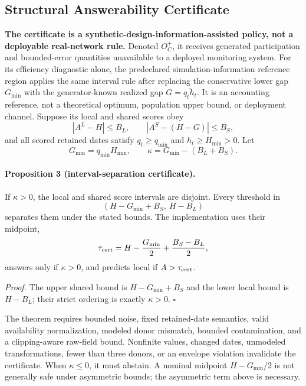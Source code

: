\subsection{Structural Answerability Certificate}

\textbf{The certificate is a synthetic-design-information-assisted policy, not
a deployable real-network rule.} Denoted $O_C^+$, it receives generated
participation and bounded-error quantities unavailable to a deployed monitoring
system. For its efficiency diagnostic alone, the predeclared
simulation-information reference region applies the same interval rule after
replacing the conservative lower gap $G_{\min}$ with the generator-known
realized gap $G=\overline{q_th_t}$. It is an accounting reference, not a
theoretical optimum, population upper bound, or deployment channel. Suppose
its local and shared scores obey
\[
  |A^L-H|\leq B_L,\qquad
  |A^S-(H-G)|\leq B_S,
\]
and all scored retained dates satisfy $q_t\geq q_{\min}$ and
$h_t\geq H_{\min}>0$. Let
\[
  G_{\min}=q_{\min}H_{\min},\qquad
  \kappa=G_{\min}-(B_L+B_S).
\]

\paragraph{Proposition 3 (interval-separation certificate).}
If $\kappa>0$, the local and shared score intervals are disjoint. Every
threshold in
\[
  \left(H-G_{\min}+B_S,\ H-B_L\right)
\]
separates them under the stated bounds. The implementation uses their
midpoint,
\[
  \tau_{\rm cert}
  =H-\frac{G_{\min}}2+\frac{B_S-B_L}{2},
\]
answers only if $\kappa>0$, and predicts local if $A>\tau_{\rm cert}$.

\noindent\emph{Proof.} The upper shared bound is
$H-G_{\min}+B_S$ and the lower local bound is $H-B_L$; their strict ordering is
exactly $\kappa>0$. \hfill$\square$

The theorem requires bounded noise, fixed retained-date semantics, valid
availability normalization, modeled donor mismatch, bounded contamination, and
a clipping-aware raw-field bound. Nonfinite values, changed dates, unmodeled
transformations, fewer than three donors, or an envelope violation invalidate
the certificate. When $\kappa\leq0$, it must abstain. A nominal midpoint
$H-G_{\min}/2$ is not generally safe under asymmetric bounds; the asymmetric
term above is necessary.
